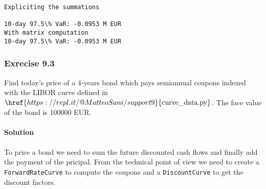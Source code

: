 \documentclass[11pt]{article}
\begin{document}
    \begin{Verbatim}[commandchars=\\\{\}]
Expliciting the summations

10-day 97.5\% VaR: -0.0953 M EUR
With matrix computation
10-day 97.5\% VaR: -0.0953 M EUR
    \end{Verbatim}

    \hypertarget{exrecise-9.3}{%
\subsubsection{Exrecise 9.3}\label{exrecise-9.3}}

Find today's price of a 4-years bond which pays semiannual coupons
indexed with the LIBOR curve defined in
\(\href{https://repl.it/@MatteoSani/support9}{\textrm{curve\_data.py}}\).
The face value of the bond is 100000 EUR.

\hypertarget{solution}{%
\paragraph{Solution}\label{solution}}

To price a bond we need to sum the future discounted cash flows and
finally add the payment of the pricipal. From the technical point of
view we need to create a \texttt{ForwardRateCurve} to compute the
coupons and a \texttt{DiscountCurve} to get the discount factors.
\end{document}
